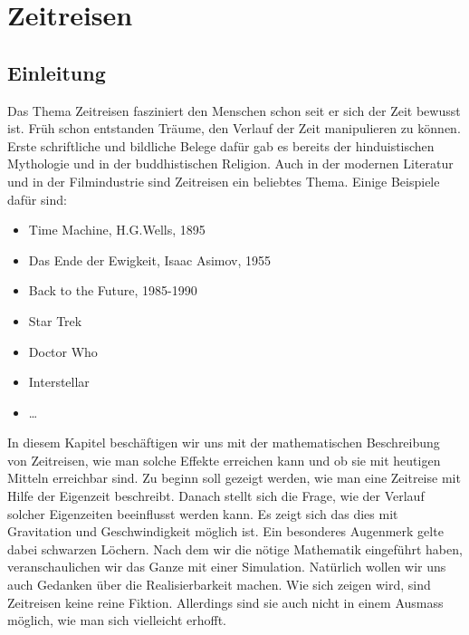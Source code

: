 \chapter{Zeitreisen\label{chapter:thema}}
\begin{refsection}
\section{Einleitung}

	Das Thema Zeitreisen fasziniert den Menschen schon seit er sich der Zeit bewusst ist. Früh schon entstanden Träume, den Verlauf der Zeit manipulieren zu können. Erste schriftliche und bildliche Belege dafür gab es bereits der hinduistischen Mythologie und in der buddhistischen Religion. Auch in der modernen Literatur und in der Filmindustrie sind Zeitreisen ein beliebtes Thema. Einige Beispiele daf\"ur sind: 
\begin{itemize}
    \item Time Machine, H.G.Wells, 1895 
    \item Das Ende der Ewigkeit, Isaac Asimov, 1955
    \item Back to the Future, 1985-1990
    \item Star Trek
    \item Doctor Who
    \item Interstellar
    \item \dots

\end{itemize}
In diesem Kapitel beschäftigen wir uns mit der mathematischen Beschreibung von Zeitreisen, wie man solche Effekte erreichen kann und ob sie mit heutigen Mitteln erreichbar sind. Zu beginn soll gezeigt werden, wie man eine Zeitreise mit Hilfe der Eigenzeit beschreibt. Danach stellt sich die Frage, wie der Verlauf solcher Eigenzeiten beeinflusst werden kann. Es zeigt sich das dies mit Gravitation und Geschwindigkeit möglich ist. Ein besonderes Augenmerk gelte dabei schwarzen Löchern. Nach dem wir die nötige Mathematik eingeführt haben, veranschaulichen wir das Ganze mit einer Simulation. Natürlich wollen wir uns auch Gedanken über die Realisierbarkeit machen. Wie sich zeigen wird, sind Zeitreisen keine reine Fiktion. Allerdings sind sie auch nicht in einem Ausmass möglich, wie man sich vielleicht erhofft.

\end{refsection}
